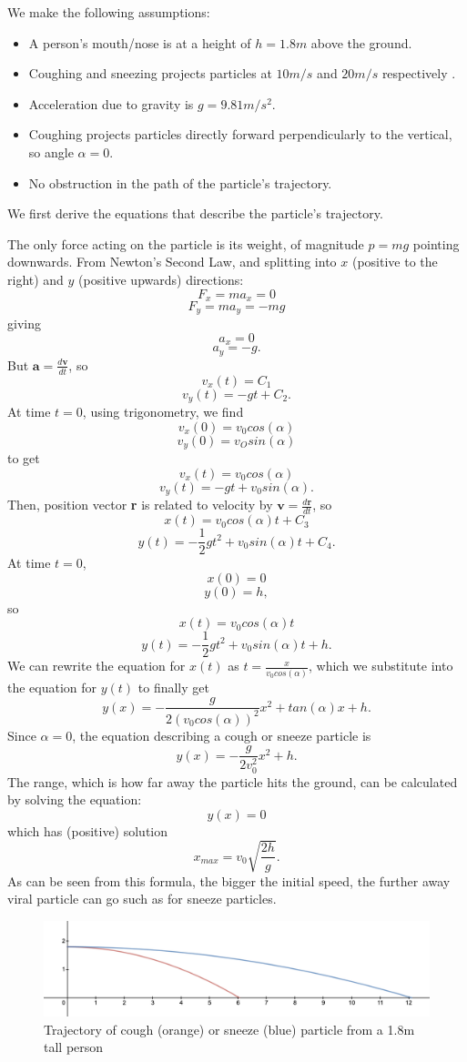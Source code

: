 \documentclass[11pt]{report}
\begin{document}
We make the following assumptions:
\begin{itemize}
    \item A person’s mouth/nose is at a height of $h=1.8m$ above the ground.
    \item Coughing and sneezing projects particles at $10 m/s$ and $20 m/s$ respectively \cite{distribution droplets}.
    \item Acceleration due to gravity is $g=9.81 m/s^2$.
    \item Coughing projects particles directly forward perpendicularly to the vertical, so angle $\alpha=0$.
    \item No obstruction in the path of the particle's trajectory.
\end{itemize}


We first derive the equations that describe the particle’s trajectory.

The only force acting on the particle is its weight, of magnitude $p=mg$ pointing downwards. From Newton’s Second Law, and splitting into $x$ (positive to the right) and $y$ (positive upwards) directions:
$$
F_x=ma_x=0
$$
$$
F_y=ma_y=-mg
$$
giving
$$
a_x=0
$$
$$
a_y=-g.
$$
But $\textbf{a}=\frac{d\textbf{v}}{dt}$, so
$$
v_x(t)=C_1
$$
$$
v_y(t)=-gt+C_2.
$$
At time $t=0$, using trigonometry, we find 
$$
v_x(0)=v_0cos(\alpha)
$$
$$
v_y(0)=v_Osin(\alpha)
$$
to get 
$$
v_x(t)=v_0cos(\alpha)
$$
$$
v_y(t)=-gt+v_0sin(\alpha).
$$
Then, position vector \textbf{r} is related to velocity by $\textbf{v}=\frac{d\textbf{r}}{dt}$, so
$$
x(t)=v_0cos(\alpha)t+C_3
$$
$$
y(t)=-\frac{1}{2}gt^2+v_0sin(\alpha)t+C_4.
$$
At time $t=0$,
$$
x(0)=0
$$
$$
y(0)=h,
$$
so
$$
x(t)=v_0cos(\alpha)t
$$
$$
y(t)=-\frac{1}{2}gt^2+v_0sin(\alpha)t+h.
$$
We can rewrite the equation for $x(t)$ as $t=\frac{x}{v_0cos(\alpha)}$, which we substitute into the equation for $y(t)$ to finally get
$$
y(x)=-\frac{g}{2(v_0cos(\alpha))^2}x^2+tan(\alpha)x+h.
$$
Since $\alpha=0$, the equation describing a cough or sneeze particle is
$$
y(x)=-\frac{g}{2v_0^2}x^2+h.
$$
The range, which is how far away the particle hits the ground, can be calculated by solving the equation: 
$$
y(x)=0
$$
which has (positive) solution
$$
x_{max}=v_0\sqrt{\frac{2h}{g}}.
$$
As can be seen from this formula, the bigger the initial speed, the further away viral particle can go such as for sneeze particles.

\begin{figure}[h!]
    \centering
    \includegraphics[width=.8\textwidth,clip]{Cough and sneeze trajectory.png}
    \caption{Trajectory of cough (orange) or sneeze (blue) particle from a 1.8m tall person}
    
\end{figure}
\end{document}
